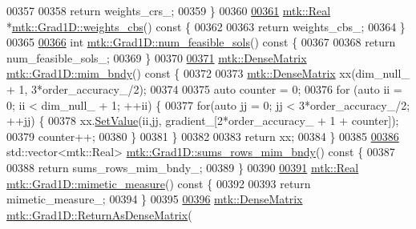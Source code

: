 \begin{DoxyCode}
{{00357 
00358   \textcolor{keywordflow}{return} weights\_crs\_;
00359 \}
00360 
\hypertarget{mtk__grad__1d_8cc_source_l00361}{}\hyperlink{classmtk_1_1Grad1D_ad11927d8f9f1ca0089aaa2be7094f7f3}{00361} \hyperlink{group__c01-roots_gac080bbbf5cbb5502c9f00405f894857d}{mtk::Real} *\hyperlink{classmtk_1_1Grad1D_ad11927d8f9f1ca0089aaa2be7094f7f3}{mtk::Grad1D::weights\_cbs}()\textcolor{keyword}{ const }\{
00362 
00363   \textcolor{keywordflow}{return} weights\_cbs\_;
00364 \}
00365 
\hypertarget{mtk__grad__1d_8cc_source_l00366}{}\hyperlink{classmtk_1_1Grad1D_a3ee5504c8fedaae9e58f00d3698f7986}{00366} \textcolor{keywordtype}{int} \hyperlink{classmtk_1_1Grad1D_a3ee5504c8fedaae9e58f00d3698f7986}{mtk::Grad1D::num\_feasible\_sols}()\textcolor{keyword}{ const }\{
00367 
00368   \textcolor{keywordflow}{return} num\_feasible\_sols\_;
00369 \}
00370 
\hypertarget{mtk__grad__1d_8cc_source_l00371}{}\hyperlink{classmtk_1_1Grad1D_ab25e1d064a5a00fbe3777e65fd5750c0}{00371} \hyperlink{classmtk_1_1DenseMatrix}{mtk::DenseMatrix} \hyperlink{classmtk_1_1Grad1D_ab25e1d064a5a00fbe3777e65fd5750c0}{mtk::Grad1D::mim\_bndy}()\textcolor{keyword}{ const }\{
00372 
00373   \hyperlink{classmtk_1_1DenseMatrix}{mtk::DenseMatrix} xx(dim\_null\_ + 1, 3*order\_accuracy\_/2);
00374 
00375   \textcolor{keyword}{auto} counter = 0;
00376   \textcolor{keywordflow}{for} (\textcolor{keyword}{auto} ii = 0; ii < dim\_null\_ + 1; ++ii) \{
00377     \textcolor{keywordflow}{for}(\textcolor{keyword}{auto} jj = 0; jj < 3*order\_accuracy\_/2; ++jj) \{
00378       xx.\hyperlink{classmtk_1_1DenseMatrix_a784ce5784109ac86bfb9d8562b334b13}{SetValue}(ii,jj, gradient\_[2*order\_accuracy\_ + 1 + counter]);
00379       counter++;
00380     \}
00381   \}
00382 
00383   \textcolor{keywordflow}{return} xx;
00384 \}
00385 
\hypertarget{mtk__grad__1d_8cc_source_l00386}{}\hyperlink{classmtk_1_1Grad1D_ab1c580e5e7f6fad9a0f643b48d3e0e55}{00386} std::vector<mtk::Real> \hyperlink{classmtk_1_1Grad1D_ab1c580e5e7f6fad9a0f643b48d3e0e55}{mtk::Grad1D::sums\_rows\_mim\_bndy}()\textcolor{keyword}{ const }\{
00387 
00388   \textcolor{keywordflow}{return} sums\_rows\_mim\_bndy\_;
00389 \}
00390 
\hypertarget{mtk__grad__1d_8cc_source_l00391}{}\hyperlink{classmtk_1_1Grad1D_a66bb2a8e60e685a0be897548ade3a6d6}{00391} \hyperlink{group__c01-roots_gac080bbbf5cbb5502c9f00405f894857d}{mtk::Real} \hyperlink{classmtk_1_1Grad1D_a66bb2a8e60e685a0be897548ade3a6d6}{mtk::Grad1D::mimetic\_measure}()\textcolor{keyword}{ const }\{
00392 
00393   \textcolor{keywordflow}{return} mimetic\_measure\_;
00394 \}
00395 
\hypertarget{mtk__grad__1d_8cc_source_l00396}{}\hyperlink{classmtk_1_1Grad1D_a77b2eddbe4ab03f469306c604d505b1a}{00396} \hyperlink{classmtk_1_1DenseMatrix}{mtk::DenseMatrix} \hyperlink{classmtk_1_1Grad1D_a77b2eddbe4ab03f469306c604d505b1a}{mtk::Grad1D::ReturnAsDenseMatrix}(
}}
\end{DoxyCode}
